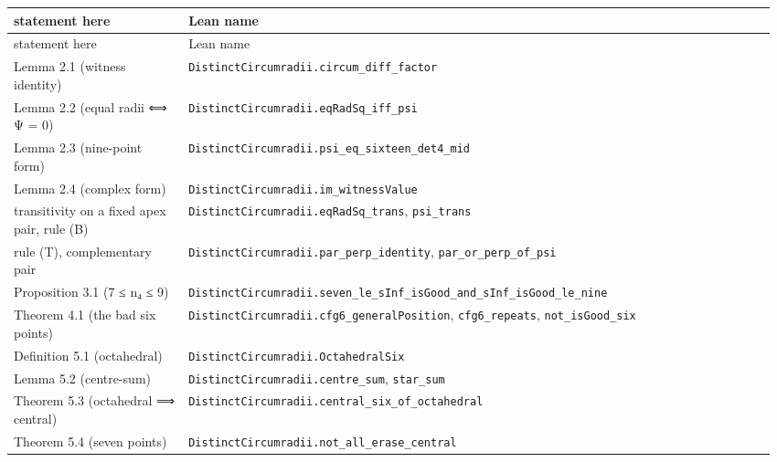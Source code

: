 \documentclass[11pt,a4paper]{article}
\theoremstyle{named}
\begin{document}
\begin{small}
\begin{longtable}{>{\raggedright\arraybackslash}p{0.229\linewidth}>{\raggedright\arraybackslash}p{0.743\linewidth}}
\hline
\textbf{statement here} & \textbf{Lean name} \\
\hline\endfirsthead
\hline
statement here & Lean name \\
\hline\endhead
Lemma 2.1 (witness identity) & \texttt{DistinctCircumradii.\allowbreak{}circum\_\allowbreak{}diff\_\allowbreak{}factor} \\
Lemma 2.2 (equal radii ⟺ Ψ = 0) & \texttt{DistinctCircumradii.\allowbreak{}eqRadSq\_\allowbreak{}iff\_\allowbreak{}psi} \\
Lemma 2.3 (nine-point form) & \texttt{DistinctCircumradii.\allowbreak{}psi\_\allowbreak{}eq\_\allowbreak{}sixteen\_\allowbreak{}det4\_\allowbreak{}mid} \\
Lemma 2.4 (complex form) & \texttt{DistinctCircumradii.\allowbreak{}im\_\allowbreak{}witnessValue} \\
transitivity on a fixed apex pair, rule (B) & \texttt{DistinctCircumradii.\allowbreak{}eqRadSq\_\allowbreak{}trans}, \texttt{psi\_\allowbreak{}trans} \\
rule (T), complementary pair & \texttt{DistinctCircumradii.\allowbreak{}par\_\allowbreak{}perp\_\allowbreak{}identity}, \texttt{par\_\allowbreak{}or\_\allowbreak{}perp\_\allowbreak{}of\_\allowbreak{}psi} \\
Proposition 3.1 (7 ≤ n₄ ≤ 9) & \texttt{DistinctCircumradii.\allowbreak{}seven\_\allowbreak{}le\_\allowbreak{}sInf\_\allowbreak{}isGood\_\allowbreak{}and\_\allowbreak{}sInf\_\allowbreak{}isGood\_\allowbreak{}le\_\allowbreak{}nine} \\
Theorem 4.1 (the bad six points) & \texttt{DistinctCircumradii.\allowbreak{}cfg6\_\allowbreak{}generalPosition}, \texttt{cfg6\_\allowbreak{}repeats}, \texttt{not\_\allowbreak{}isGood\_\allowbreak{}six} \\
Definition 5.1 (octahedral) & \texttt{DistinctCircumradii.\allowbreak{}OctahedralSix} \\
Lemma 5.2 (centre-sum) & \texttt{DistinctCircumradii.\allowbreak{}centre\_\allowbreak{}sum}, \texttt{star\_\allowbreak{}sum} \\
Theorem 5.3 (octahedral ⟹ central) & \texttt{DistinctCircumradii.\allowbreak{}central\_\allowbreak{}six\_\allowbreak{}of\_\allowbreak{}octahedral} \\
Theorem 5.4 (seven points) & \texttt{DistinctCircumradii.\allowbreak{}not\_\allowbreak{}all\_\allowbreak{}erase\_\allowbreak{}central} \\

\end{longtable}
\end{small}
\end{document}

